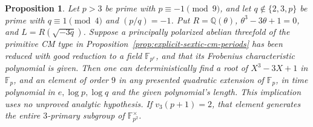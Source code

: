 \documentclass[11pt]{article}
\newtheorem{proposition}[theorem]{Proposition}
\theoremstyle{definition}
\theoremstyle{remark}
\begin{document}
\begin{proposition}\label{prop:sextic-cm-output}
Let \(p>3\) be prime with \(p\equiv-1\pmod9\), and let
\(q\notin\{2,3,p\}\) be prime with
\(q\equiv1\pmod4\) and \((p/q)=-1\).
Put \(R=\mathbb Q(\theta)\), \(\theta^3-3\theta+1=0\),
and \(L=R(\sqrt{-3q})\).
Suppose a principally polarized abelian threefold of the primitive
CM type in Proposition~\ref{prop:explicit-sextic-cm-periods}
has been reduced with good reduction to a field \(\mathbb F_{p^e}\),
and that its Frobenius characteristic polynomial is given.
Then one can deterministically find a root of
\(X^3-3X+1\) in \(\mathbb F_p\), and an element of order \(9\)
in any presented quadratic extension of \(\mathbb F_p\), in time
polynomial in \(e,\log p,\log q\) and the given polynomial's length.
This implication uses no unproved analytic hypothesis.
If \(v_3(p+1)=2\), that element generates the entire
\(3\)-primary subgroup of \(\mathbb F_{p^2}^\times\).
\end{proposition}
\end{document}
